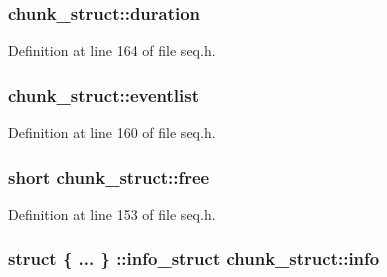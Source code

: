 \subsubsection[{\texorpdfstring{duration}{duration}}]{ chunk\+\_\+struct\+::duration}\hypertarget{structchunk__struct_a0b3c45f65bd02dedda508f30613216b2}{}\label{structchunk__struct_a0b3c45f65bd02dedda508f30613216b2}


Definition at line 164 of file seq.\+h.

\subsubsection[{\texorpdfstring{eventlist}{eventlist}}]{ chunk\+\_\+struct\+::eventlist}\hypertarget{structchunk__struct_a50449feec0417c81c43a7ba9b0a042e4}{}\label{structchunk__struct_a50449feec0417c81c43a7ba9b0a042e4}


Definition at line 160 of file seq.\+h.

\subsubsection[{\texorpdfstring{free}{free}}]{\setlength{\rightskip}{0pt plus 5cm}short chunk\+\_\+struct\+::free}\hypertarget{structchunk__struct_a040378291dd24f6c361a846e7ad542ab}{}\label{structchunk__struct_a040378291dd24f6c361a846e7ad542ab}


Definition at line 153 of file seq.\+h.

\subsubsection[{\texorpdfstring{info}{info}}]{\setlength{\rightskip}{0pt plus 5cm}struct \{ ... \} \+::info\+\_\+struct  chunk\+\_\+struct\+::info}\hypertarget{structchunk__struct_af8fb106d83da76450d173cf81b424004}{}\label{structchunk__struct_af8fb106d83da76450d173cf81b424004}
